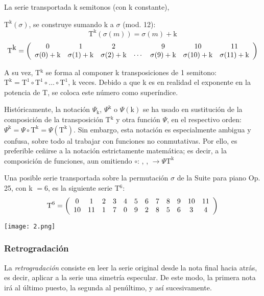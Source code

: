 		La serie transportada k semitonos (con k constante),
		
		$\mbox{T}^{{\mbox{k}}}(\sigma)$, se construye sumando k a $\sigma$ (mod. 12):
		\[\mbox{T}^{{\mbox{k}}}(\sigma(m))=\sigma(m)+{\mbox{k}}\]		
		{\[
		\mbox{T}^{{\mbox{k}}}=
		\left(\begin{array}{*{7}c}
			0&1&2&&9&10&11\\
			\sigma(0)+{\mbox{k}}&\sigma(1)+{\mbox{k}}&\sigma(2)+{\mbox{k}}&
			\cdots&
			\sigma(9)+{\mbox{k}}&\sigma(10)+{\mbox{k}}&\sigma(11)+{\mbox{k}}\\
		\end{array}\right)
		\]}
		
		A su vez, T$^{\mbox{k}}$ se forma al componer k transposiciones de 1 semitono: $\mbox{T}^{\mbox{k}}=\mbox{T}^1\circ\mbox{T}^1\circ\ldots\circ\mbox{T}^1$, k veces. Debido a que k es en realidad el exponente en la potencia de T, se coloca este n\'umero como super\'indice.
		
		Hist\'oricamente, la notaci\'on $\Psi_{\mbox{k}}$, $\Psi^{\mbox{k}}$ o $\Psi({\mbox{k}})$ se ha usado en sustituci\'on de la composici\'on de la transposici\'on T$^{\mbox{k}}$ y otra funci\'on $\Psi$, en el respectivo orden: $\Psi^{\mbox{k}}=\Psi \circ \mbox{T}^{\mbox{k}} = \Psi(\mbox{T}^{\mbox{k}})$. Sin embargo, esta notaci\'on es especialmente ambigua y confusa, sobre todo al trabajar con funciones no conmutativas. Por ello, es preferible ce\~nirse a la notaci\'on estrictamente matem\'atica; es decir, a la composici\'on de funciones, aun omitiendo $\circ$: , ,  $\rightarrow \Psi\mbox{T}^{\mbox{k}}$
		
		Una posible serie transportada sobre la permutaci\'on $\sigma$ de la Suite para piano Op. 25, con k $= 6$, es la siguiente serie T$^6$:
		\[\mbox{T}^6=\drow{10,11,1,7,0,9,2,8,5,6,3,4}\]	
		\begin{center}
			\texttt{[image: 2.png]}
		\end{center}
		
	\subsubsection{Retrogradaci\'on}
		La \emph{retrogradaci\'on} consiste en leer la serie original desde la nota final hacia atr\'as, es decir, aplicar a la serie una simetr\'ia especular. De este modo, la primera nota ir\'a al \'ultimo puesto, la segunda al pen\'ultimo, y as\'i sucesivamente.
		
